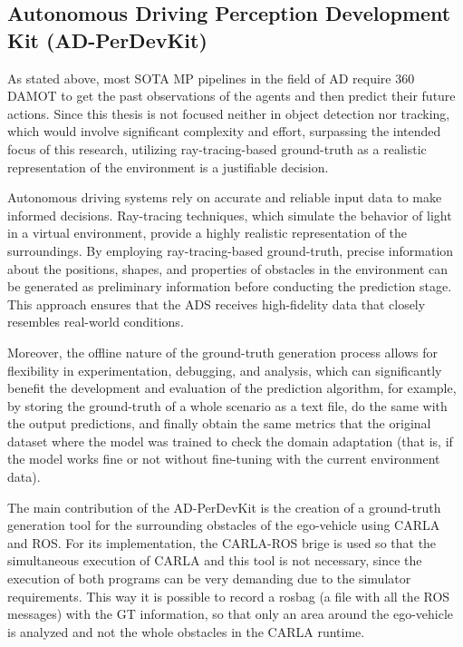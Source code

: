 \subsection{Autonomous Driving Perception Development Kit (AD-PerDevKit)}
\label{subsec:8_ad_perdevkit}

As stated above, most \ac{SOTA} \ac{MP} pipelines in the field of \ac{AD} require 360 \degree \ac{DAMOT} to get the past observations of the agents and then predict their future actions. Since this thesis is not focused neither in object detection nor tracking, which would involve significant complexity and effort, surpassing the intended focus of this research, utilizing ray-tracing-based ground-truth as a realistic representation of the environment is a justifiable decision.

Autonomous driving systems rely on accurate and reliable input data to make informed decisions. Ray-tracing techniques, which simulate the behavior of light in a virtual environment, provide a highly realistic representation of the surroundings. By employing ray-tracing-based ground-truth, precise information about the positions, shapes, and properties of obstacles in the environment can be generated as preliminary information before conducting the prediction stage. This approach ensures that the \ac{ADS} receives high-fidelity data that closely resembles real-world conditions. 

Moreover, the offline nature of the ground-truth generation process allows for flexibility in experimentation, debugging, and analysis, which can significantly benefit the development and evaluation of the prediction algorithm, for example, by storing the ground-truth of a whole scenario as a text file, do the same with the output predictions, and finally obtain the same metrics that the original dataset where the model was trained to check the domain adaptation (that is, if the model works fine or not without fine-tuning with the current environment data).

The main contribution of the AD-PerDevKit is the creation of a ground-truth generation tool for the surrounding obstacles of the ego-vehicle using CARLA and ROS. For its implementation, the CARLA-ROS brige is used so that the simultaneous execution of CARLA and this tool is not necessary, since the execution of both programs can be very demanding due to the simulator requirements. This way it is possible to record a rosbag (a file with all the ROS messages) with the GT information, so that only an area around the ego-vehicle is analyzed and not the whole obstacles in the CARLA runtime.

